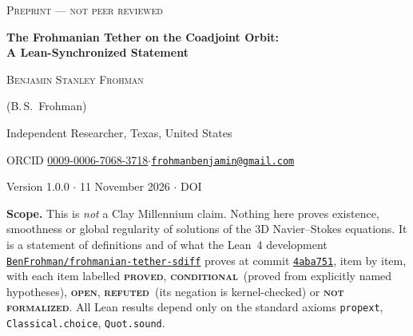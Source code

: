 \documentclass[11pt]{article}
\newcommand{\pin}{4aba751d2d365faf0cc48c5b46e9aa0113519273}
\newcommand{\pinshort}{4aba751}
\newcommand{\repo}{https://github.com/BenFrohman/frohmanian-tether-sdiff}
\newcommand{\tagbox}[2]{\textcolor{#1}{\textbf{\textsc{#2}}}}
\newcommand{\PROVED}{\tagbox{green!45!black}{proved}}
\newcommand{\COND}{\tagbox{orange!75!black}{conditional}}
\newcommand{\OPEN}{\tagbox{blue!60!black}{open}}
\newcommand{\REFUTED}{\tagbox{red!65!black}{refuted}}
\newcommand{\NF}{\tagbox{gray!80!black}{not formalized}}
\begin{document}
\thispagestyle{plain}
\begin{center}
{\small\scshape\color{red!60!black} Preprint --- not peer reviewed\par}\vspace{10pt}
{\LARGE\bfseries The Frohmanian Tether on the Coadjoint Orbit:\\[2pt] A Lean-Synchronized Statement\par}\vspace{10pt}
{\large\scshape Benjamin Stanley Frohman\par}\vspace{1pt}
{\small (B.\,S.~Frohman)\par}\vspace{3pt}
{\small Independent Researcher, Texas, United States\par}\vspace{2pt}
{\small ORCID \href{https://orcid.org/0009-0006-7068-3718}{0009-0006-7068-3718}\quad$\cdot$\quad\href{mailto:frohmanbenjamin@gmail.com}{\nolinkurl{frohmanbenjamin@gmail.com}}\par}\vspace{2pt}
{\small Version 1.0.0 $\cdot$ 11 November 2026 $\cdot$ DOI \par}
\end{center}
\vspace{4pt}

\begin{scopebox}
\textbf{Scope.} This is \emph{not} a Clay Millennium claim. Nothing here proves existence,
smoothness or global regularity of solutions of the 3D Navier--Stokes equations. It is a
statement of definitions and of what the Lean~4 development
\href{\repo}{\nolinkurl{BenFrohman/frohmanian-tether-sdiff}} proves at commit
\href{\repo/tree/\pin}{\texttt{\pinshort}}, item by item, with each item labelled
\PROVED, \COND\ (proved from explicitly named hypotheses), \OPEN, \REFUTED\ (its negation is
kernel-checked) or \NF. All Lean results depend only on the standard axioms
\texttt{propext}, \texttt{Classical.choice}, \texttt{Quot.sound}.
\end{scopebox}
\end{document}
